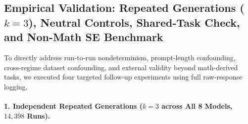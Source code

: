 \documentclass[a4paper,fleqn]{cas-sc}
\begin{document}
\subsection{Empirical Validation: Repeated Generations ($k = 3$), Neutral Controls, Shared-Task Check, and Non-Math SE Benchmark}\label{empirical-validation-suite}

To directly address run-to-run nondeterminism, prompt-length confounding, cross-regime dataset confounding, and external validity beyond math-derived tasks, we executed four targeted follow-up experiments using full raw-response logging.

\paragraph{1. Independent Repeated Generations ($k = 3$ across All 8 Models, $14{,}398$ Runs).}
\end{document}
